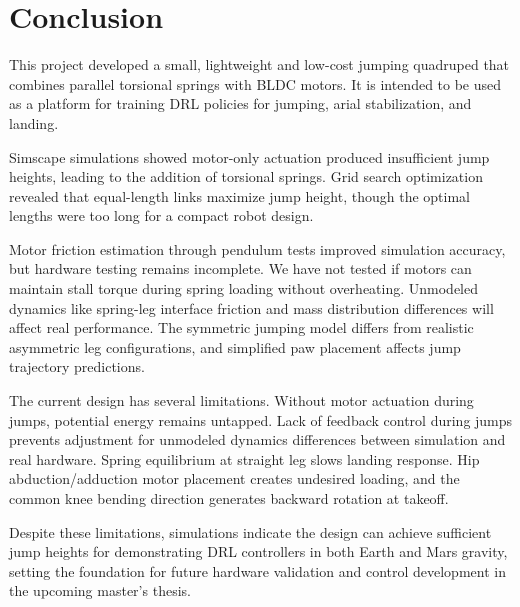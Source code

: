 \section{Conclusion}
\label{sec:conclusion}

This project developed a small, lightweight and low-cost jumping quadruped that combines parallel torsional springs with BLDC motors. It is intended to be used as a platform for training DRL policies for jumping, arial stabilization, and landing.

Simscape simulations showed motor-only actuation produced insufficient jump heights, leading to the addition of torsional springs. Grid search optimization revealed that equal-length links maximize jump height, though the optimal lengths were too long for a compact robot design.

Motor friction estimation through pendulum tests improved simulation accuracy, but hardware testing remains incomplete. We have not tested if motors can maintain stall torque during spring loading without overheating. Unmodeled dynamics like spring-leg interface friction and mass distribution differences will affect real performance. The symmetric jumping model differs from realistic asymmetric leg configurations, and simplified paw placement affects jump trajectory predictions.

The current design has several limitations. Without motor actuation during jumps, potential energy remains untapped. Lack of feedback control during jumps prevents adjustment for unmodeled dynamics differences between simulation and real hardware. Spring equilibrium at straight leg slows landing response. Hip abduction/adduction motor placement creates undesired loading, and the common knee bending direction generates backward rotation at takeoff.

Despite these limitations, simulations indicate the design can achieve sufficient jump heights for demonstrating DRL controllers in both Earth and Mars gravity, setting the foundation for future hardware validation and control development in the upcoming master's thesis.
